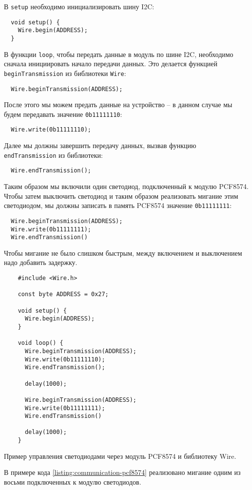 \documentclass[../sparc.tex]{subfiles}
\begin{document}
В \texttt{setup} необходимо инициализировать шину I2C:

\begin{verbatim}
  void setup() {
    Wire.begin(ADDRESS);
  }
\end{verbatim}

В функции \texttt{loop}, чтобы передать данные в модуль по шине I2C, необходимо
сначала инициировать начало передачи данных.  Это делается функцией
\texttt{beginTransmission} из библиотеки \texttt{Wire}:

\begin{verbatim}
  Wire.beginTransmission(ADDRESS);
\end{verbatim}

После этого мы можем предать данные на устройство -- в данном случае мы будем
передавать значение \texttt{0b11111110}:

\begin{verbatim}
  Wire.write(0b11111110);
\end{verbatim}

Далее мы должны завершить передачу данных, вызвав функцию
\texttt{endTransmission} из библиотеки:

\begin{verbatim}
  Wire.endTransmission();
\end{verbatim}

Таким образом мы включили один светодиод, подключенный к модулю PCF8574.  Чтобы
затем выключить светодиод и таким образом реализовать мигание этим светодиодом,
мы должны записать в память PCF8574 значение \texttt{0b11111111}:

\begin{verbatim}
  Wire.beginTransmission(ADDRESS);
  Wire.write(0b11111111);
  Wire.endTransmission()
\end{verbatim}

Чтобы мигание не было слишком быстрым, между включением и выключением надо
добавить задержку.

\begin{listing}[H]
  \begin{verbatim}
    #include <Wire.h>

    const byte ADDRESS = 0x27;

    void setup() {
      Wire.begin(ADDRESS);
    }

    void loop() {
      Wire.beginTransmission(ADDRESS);
      Wire.write(0b11111110);
      Wire.endTransmission();

      delay(1000);

      Wire.beginTransmission(ADDRESS);
      Wire.write(0b11111111);
      Wire.endTransmission()

      delay(1000);
    }
  \end{verbatim}
  \label{listing:communication-pcf8574}
  \caption{Пример управления светодиодами через модуль PCF8574 и библиотеку
    Wire.}
\end{listing}

В примере кода \ref{listing:communication-pcf8574} реализовано мигание одним из
восьми подключенных к модулю светодиодов.
\end{document}
